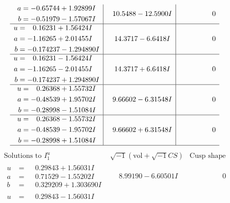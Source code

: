 \documentclass[1p]{elsarticle_modified}
\theoremstyle{definition}
\newcommand{\I}{\sqrt{-1}}
\begin{document}
$$\begin{array}{c|c|c}
\begin{aligned}
a &= -0.65744 + 1.92899 I \\
b &= -0.51979 - 1.57067 I\end{aligned}
 & \phantom{-}10.5488 - 12.5900 I & \phantom{-0.000000 } 0 \\ \hline\begin{aligned}
u &= \phantom{-}0.16231 + 1.56424 I \\
a &= -1.16265 + 2.01455 I \\
b &= -0.174237 - 1.294890 I\end{aligned}
 & \phantom{-}14.3717 - 6.6418 I & \phantom{-0.000000 } 0 \\ \hline\begin{aligned}
u &= \phantom{-}0.16231 - 1.56424 I \\
a &= -1.16265 - 2.01455 I \\
b &= -0.174237 + 1.294890 I\end{aligned}
 & \phantom{-}14.3717 + 6.6418 I & \phantom{-0.000000 } 0 \\ \hline\begin{aligned}
u &= \phantom{-}0.26368 + 1.55732 I \\
a &= -0.48539 + 1.95702 I \\
b &= -0.28998 - 1.51084 I\end{aligned}
 & \phantom{-}9.66602 - 6.31548 I & \phantom{-0.000000 } 0 \\ \hline\begin{aligned}
u &= \phantom{-}0.26368 - 1.55732 I \\
a &= -0.48539 - 1.95702 I \\
b &= -0.28998 + 1.51084 I\end{aligned}
 & \phantom{-}9.66602 + 6.31548 I & \phantom{-0.000000 } 0\\
 \hline 
 \end{array}$$\newpage$$\begin{array}{c|c|c}  
\text{Solutions to }I^u_{1}& \I (\text{vol} + \sqrt{-1}CS) & \text{Cusp shape}\\
 \hline 
\begin{aligned}
u &= \phantom{-}0.29843 + 1.56031 I \\
a &= \phantom{-}0.71529 - 1.55202 I \\
b &= \phantom{-}0.329209 + 1.303690 I\end{aligned}
 & \phantom{-}8.99190 - 6.60501 I & \phantom{-0.000000 } 0 \\ \hline\begin{aligned}
u &= \phantom{-}0.29843 - 1.56031 I \\

\end{aligned}
\end{array}$$
\end{document}
